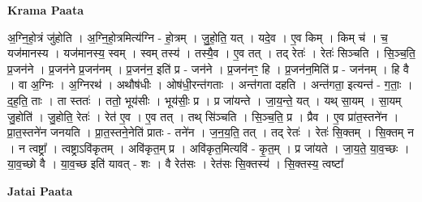 \documentclass[17pt]{extarticle}
\begin{document}
\textbf{Krama Paata} \newline

अ॒ग्नि॒हो॒त्रं जु॑होति । अ॒ग्नि॒हो॒त्रमित्य॑ग्नि - हो॒त्रम् । जु॒हो॒ति॒ यत् । यदे॒व । ए॒व किम् । किम् च॑ । च॒ यज॑मानस्य । यज॑मानस्य॒ स्वम् । स्वम् तस्य॑ । तस्यै॒व । ए॒व तत् । तद् रेतः॑ । रेतः॑ सिञ्चति । सि॒ञ्च॒ति॒ प्र॒जन॑ने । प्र॒जन॑ने प्र॒जन॑नम् । प्र॒जन॑न॒ इति॑ प्र - जन॑ने । प्र॒जन॑नꣳ॒॒ हि । प्र॒जन॑न॒मिति॑ प्र - जन॑नम् । हि वै । वा अ॒ग्निः । अ॒ग्निरथ॑ । अथौष॑धीः । ओष॑धी॒रन्त॑गताः । अन्त॑गता दहति । अन्त॑गता॒ इत्यन्त॑ - ग॒ताः॒ । द॒ह॒ति॒ ताः । ता स्ततः॑ । ततो॒ भूय॑सीः । भूय॑सीः॒ प्र । प्र जा॑यन्ते । जा॒य॒न्ते॒ यत् । यथ् सा॒यम् । सा॒यम् जु॒होति॑ । जु॒होति॒ रेतः॑ । रेत॑ ए॒व । ए॒व तत् । तथ् सि॑ञ्चति । सि॒ञ्च॒ति॒ प्र । प्रैव । ए॒व प्रा॑त॒स्तने॑न । प्रा॒त॒स्तने॑न जनयति । प्रा॒त॒स्तने॒नेति॑ प्रातः - तने॑न । ज॒न॒य॒ति॒ तत् । तद् रेतः॑ । रेतः॑ सि॒क्तम् । सि॒क्तम् न । न त्वष्ट्रा᳚ । त्वष्ट्राऽवि॑कृतम् । अवि॑कृत॒म् प्र । अवि॑कृत॒मित्यवि॑ - कृ॒त॒म् । प्र जा॑यते । जा॒य॒ते॒ या॒व॒च्छः । या॒व॒च्छो वै । या॒व॒च्छ इति॑ यावत् - शः । वै रेत॑सः । रेत॑सः सि॒क्तस्य॑ । सि॒क्तस्य॒ त्वष्टा᳚ \newline

\textbf{Jatai Paata} \newline
\end{document}
